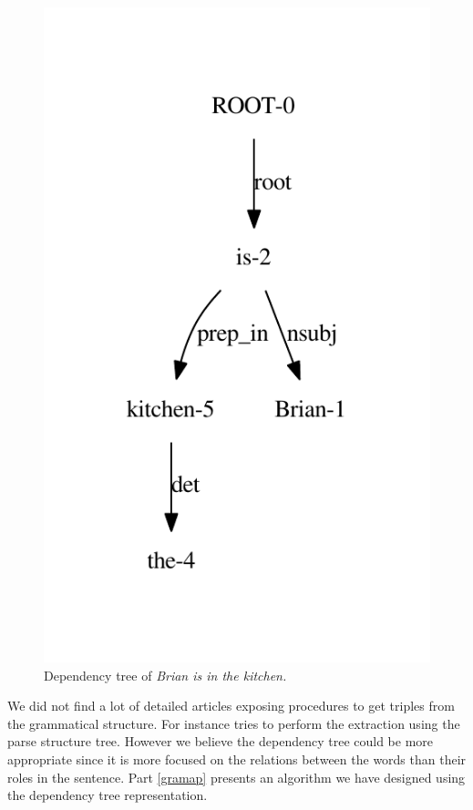 \begin{figure}
  \centering
    \includegraphics[scale=0.6]{../examples_NLP_grammatical/deptree.pdf}
  \caption{Dependency tree of \emph{Brian is in the kitchen.}}
  \label{dtree}
\end{figure}

We did not find a lot of detailed articles exposing procedures to get triples from the grammatical structure. For instance \cite{parsetree} tries to perform the extraction using the parse structure tree. However we believe the dependency tree could be more appropriate since it is more focused on the relations between the words than their roles in the sentence. Part \ref{gramap} presents an algorithm we have designed using the dependency tree representation.

